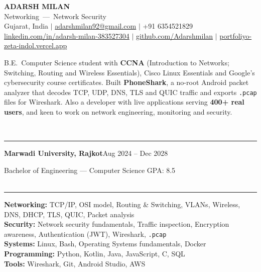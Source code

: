 \documentclass[10pt,a4paper]{article}
\renewcommand{\section}[1]{\vspace{6pt}{\large\bfseries\MakeUppercase{#1}}\\[-7pt]\rule{\textwidth}{0.6pt}\vspace{2pt}}
\newcommand{\entry}[2]{\par\textbf{#1}\hfill #2\par}
\newcommand{\sep}{\enspace$|$\enspace}
\begin{document}
\begin{center}
  {\Huge\bfseries ADARSH MILAN}\\[3pt]
  {\large Networking \,---\, Network Security}\\[3pt]
  Gujarat, India \sep
  \href{mailto:adarshmilan92@gmail.com}{adarshmilan92@gmail.com} \sep
  +91 6354521829\\[1pt]
  \href{https://www.linkedin.com/in/adarsh-milan-383527304}{linkedin.com/in/adarsh-milan-383527304} \sep
  \href{https://github.com/Adarshmilan}{github.com/Adarshmilan} \sep
  \href{https://portfoliyo-zeta-indol.vercel.app/}{portfoliyo-zeta-indol.vercel.app}
\end{center}

B.E.\ Computer Science student with \textbf{CCNA} (Introduction to Networks; Switching, Routing and Wireless Essentials),
Cisco Linux Essentials and Google's cybersecurity course certificates. Built \textbf{PhoneShark}, a no-root Android packet analyzer that decodes TCP, UDP, DNS,
TLS and QUIC traffic and exports \texttt{.pcap} files for Wireshark. Also a developer with live applications serving
\textbf{400+ real users}, and keen to work on network engineering, monitoring and security.

\section{Education}
\entry{Marwadi University, Rajkot}{Aug 2024 -- Dec 2028}
Bachelor of Engineering --- Computer Science \hfill GPA: 8.5\\

\section{Skills}
\textbf{Networking:} TCP/IP, OSI model, Routing \& Switching, VLANs, Wireless, DNS, DHCP, TLS, QUIC, Packet analysis\\
\textbf{Security:} Network security fundamentals, Traffic inspection, Encryption awareness, Authentication (JWT), Wireshark, \texttt{.pcap}\\
\textbf{Systems:} Linux, Bash, Operating Systems fundamentals, Docker\\
\textbf{Programming:} Python, Kotlin, Java, JavaScript, C, SQL\\
\textbf{Tools:} Wireshark, Git, Android Studio, AWS\\
\end{document}
